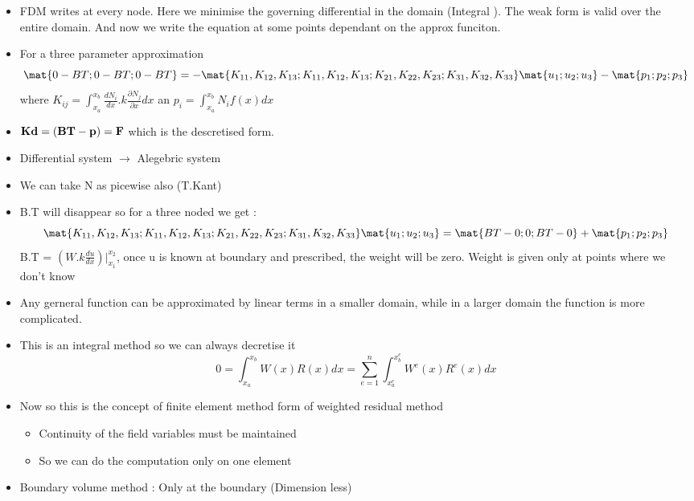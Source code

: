 	\begin{frame}
		\begin{itemize}
			\item FDM writes at every node. Here we minimise the governing differential in the domain (Integral ). The weak form is valid over the entire domain. And now we write the equation at some points dependant on the approx funciton.
			\item For a three parameter approximation
			\begin{equation}
			\mat{0-BT;0-BT;0-BT} = -\mat{K_{11},K_{12},K_{13}; K_{11},K_{12},K_{13};K_{21},K_{22},K_{23}; K_{31},K_{32},K_{33} }\mat{u_1;u_2;u_3} - \mat{p_1;p_2;p_3}
			\end{equation}
			where $K_{ij} = \int_{x_a}^{x_b} \frac{dN_i}{dx}.k \frac{\partial N_j }{\partial x} dx$ an $p_i = \int_{x_a}^{x_b} N_if(x)dx$
			\item $\mathbf{Kd = (BT-p) = F}$ which is the descretised form. 
			\item Differential system $\rightarrow$ Alegebric system
			\item We can take N as picewise also (T.Kant)
			\item B.T will disappear so for a three noded we get :
				\begin{equation}
			\mat{K_{11},K_{12},K_{13}; K_{11},K_{12},K_{13};K_{21},K_{22},K_{23}; K_{31},K_{32},K_{33} }\mat{u_1;u_2;u_3} =\mat{BT-0;0;BT-0} + \mat{p_1;p_2;p_3} 
			\end{equation}	
			B.T = $(W.k\frac{d u}{dx})|^{x_2}_{x_1}$, once u is known at boundary and prescribed, the weight will be zero. Weight is given only at points where we don't know
	\end{itemize}
	\end{frame}



	\begin{frame}
		\begin{itemize}
			\item Any  gerneral function can be approximated by linear terms in a smaller domain, while in a larger domain the function is more complicated.
			\item This is an integral method so we can always decretise it
			\begin{equation}
			0=\int_{x_a}^{x_b} W(x)R(x)dx = \sum_{e=1}^{n} \int_{x_a^e}^{x_b^e} W^e(x)R^e(x)dx
			\end{equation}
			\item Now so this is the concept of finite element method form of weighted residual method
			\begin{itemize}
				\item Continuity of the field variables must be maintained
				\item So we can do the computation only on one element
				
			\end{itemize}
			\item Boundary volume method : Only at the boundary (Dimension less)
		\end{itemize}
	\end{frame}



